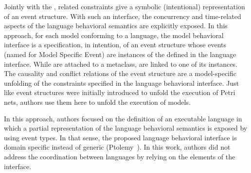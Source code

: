 Jointly with the \dse, related constraints give a symbolic (intentional) representation of an event structure. With such an interface, the concurrency and time-related aspects of the language behavioral semantics are explicitly exposed. In this approach, for each model conforming to a language, the model behavioral interface is a specification, in intention, of an event structure whose events (named \mse for Model Specific Event) are instances of the \dse defined in the language interface. While \dse are attached to a metaclass, \mse are linked to one of its instances. The causality and conflict relations of the event structure are a model-specific unfolding of the constraints specified in the language behavioral interface. Just like event structures were initially introduced to unfold the execution of Petri nets, authors use them here to unfold the execution of models. 

In this approach, authors focused on the definition of an executable language in which a partial representation of the language behavioral semantics is exposed by using event types. In that sense, the proposed language behavioral interface is domain specific instead of generic (\eg Ptolemy~\cite{ptoleframebib}). In this work, authors did not address the coordination between languages by relying on the elements of the interface.   
   	

	    	
	    	
	    				
	    				
	    				
	    				

